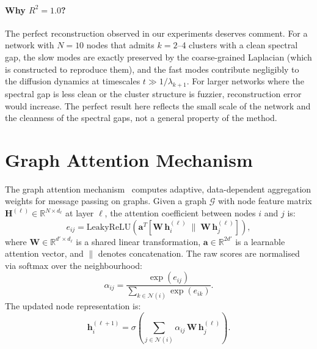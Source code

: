 \paragraph{Why $R^2 = 1.0$?}
The perfect reconstruction observed in our experiments deserves comment.
For a network with $N = 10$ nodes that admits $k = 2$--4 clusters with a
clean spectral gap, the slow modes are exactly preserved by the
coarse-grained Laplacian (which is constructed to reproduce them), and the
fast modes contribute negligibly to the diffusion dynamics at timescales
$t \gg 1/\lambda_{k+1}$.  For larger networks where the spectral gap is
less clean or the cluster structure is fuzzier, reconstruction error
would increase.  The perfect result here reflects the small scale of the
network and the cleanness of the spectral gaps, not a general property
of the method.


\section{Graph Attention Mechanism}
\label{sec:gat_theory}

The graph attention mechanism~\cite{velickovic2018graph} computes
adaptive, data-dependent aggregation weights for message passing on
graphs.  Given a graph $\mathcal{G}$ with node feature matrix
$\mathbf{H}^{(\ell)} \in \mathbb{R}^{N \times d_\ell}$ at layer
$\ell$, the attention coefficient between nodes $i$ and $j$ is:
\begin{equation}
e_{ij} = \text{LeakyReLU}\!\left(
\mathbf{a}^T\!\left[
\mathbf{W}\,\mathbf{h}_i^{(\ell)} \;\Big\|\; \mathbf{W}\,\mathbf{h}_j^{(\ell)}
\right]\right),
\label{eq:raw_attention}
\end{equation}
where $\mathbf{W} \in \mathbb{R}^{d' \times d_\ell}$ is a shared
linear transformation, $\mathbf{a} \in \mathbb{R}^{2d'}$ is a learnable
attention vector, and $\|$ denotes concatenation.  The raw scores are
normalised via softmax over the neighbourhood:
\begin{equation}
\alpha_{ij} = \frac{\exp(e_{ij})}{\sum_{k \in \mathcal{N}(i)}
\exp(e_{ik})}.
\label{eq:softmax_attention}
\end{equation}
The updated node representation is:
\begin{equation}
\mathbf{h}_i^{(\ell+1)} = \sigma\!\left(
\sum_{j \in \mathcal{N}(i)} \alpha_{ij}\,\mathbf{W}\,
\mathbf{h}_j^{(\ell)}\right).
\label{eq:gat_update}
\end{equation}

